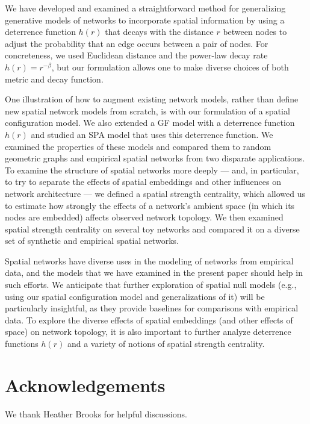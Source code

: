 \documentclass[%
 reprint,
 amsmath,amssymb,
 aps,
]{revtex4-1}
\begin{document}
We have developed and examined a straightforward method for generalizing generative models of networks to incorporate spatial information by using a deterrence function $h(r)$ that decays with the distance $r$ between nodes to adjust the probability that an edge occurs between a pair of nodes. For concreteness, we used Euclidean distance and the power-law decay rate $h(r) = r^{-\beta}$, but our formulation allows one to make diverse choices of both metric and decay function. 

One illustration of how to augment existing network models, rather than define new spatial network models from scratch, is with our formulation of a spatial configuration model. We also extended a GF model with a deterrence function $h(r)$ and studied an SPA model that uses this deterrence function. 
We examined the properties of these models and compared them to random geometric graphs and empirical spatial networks from two disparate applications. To examine the structure of spatial networks more deeply --- and, in particular, to try to separate the effects of spatial embeddings and other influences on network architecture --- we defined a spatial strength centrality, which allowed us to estimate how strongly the effects of a network's ambient space (in which its nodes are embedded) affects observed network topology. We then examined spatial strength centrality on several toy networks and compared it on a diverse set of synthetic and empirical spatial networks.

Spatial networks have diverse uses in the modeling of networks from empirical data, and the models that we have examined in the present paper should help in such efforts. We anticipate that further exploration of spatial null models (e.g., using our spatial configuration model and generalizations of it) will be particularly insightful, as they provide baselines for comparisons with empirical data. To explore the diverse effects of spatial embeddings (and other effects of space) on network topology, it is also important to further analyze deterrence functions $h(r)$ and a variety of notions of spatial strength centrality.




\section*{Acknowledgements}

We thank Heather Brooks for helpful discussions.





%
\end{document}
